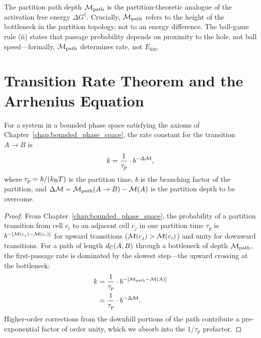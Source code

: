 \begin{remark}
The partition path depth $\mathcal{M}_{\mathrm{path}}$ is the partition-theoretic
analogue of the activation free energy $\Delta G^\ddagger$. Crucially,
$\mathcal{M}_{\mathrm{path}}$ refers to the height of the bottleneck in the
partition topology, not to an energy difference. The ball-game rule (ii)
states that passage probability depends on proximity to the hole, not ball
speed---formally, $\mathcal{M}_{\mathrm{path}}$ determines rate, not $E_{\mathrm{kin}}$.
\end{remark}

\section{Transition Rate Theorem and the Arrhenius Equation}
\label{sec:transition_rate}

\begin{theorem}
\label{thm:transition_rate}
For a system in a bounded phase space satisfying the axioms of
Chapter~\ref{chap:bounded_phase_space}, the rate constant for the
transition $A \to B$ is
\begin{equation}
  k = \frac{1}{\tau_p} \cdot b^{-\Delta\mathcal{M}},
  \label{eq:transition_rate}
\end{equation}
where $\tau_p = \hbar/(k_{\mathrm{B}} T)$ is the partition time,
$b$ is the branching factor of the partition,
and $\Delta\mathcal{M} = \mathcal{M}_{\mathrm{path}}(A \to B) - \mathcal{M}(A)$
is the partition depth to be overcome.
\end{theorem}

\begin{proof}
From Chapter~\ref{chap:bounded_phase_space}, the probability of a partition
transition from cell $c_i$ to an adjacent cell $c_j$ in one partition time
$\tau_p$ is $b^{-[\mathcal{M}(c_j) - \mathcal{M}(c_i)]}$ for upward transitions
($\mathcal{M}(c_j) > \mathcal{M}(c_i)$) and unity for downward transitions.
For a path of length $d_{\mathrm{C}}(A, B)$ through a bottleneck of depth
$\mathcal{M}_{\mathrm{path}}$, the first-passage rate is dominated by the
slowest step---the upward crossing at the bottleneck:
\begin{align}
  k &= \frac{1}{\tau_p} \cdot b^{-[\mathcal{M}_{\mathrm{path}} - \mathcal{M}(A)]} \notag \\
    &= \frac{1}{\tau_p} \cdot b^{-\Delta\mathcal{M}}.
\end{align}
Higher-order corrections from the downhill portions of the path contribute
a pre-exponential factor of order unity, which we absorb into the
$1/\tau_p$ prefactor.
\end{proof}

